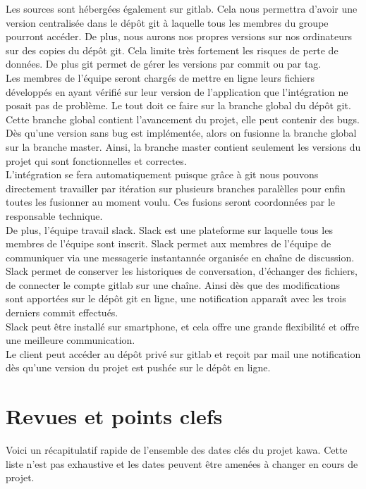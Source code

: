 \documentclass{../res/univ-projet}
\begin{document}
    Les sources sont hébergées également sur gitlab. Cela nous permettra d'avoir une version centralisée dans le dépôt git à laquelle tous les membres du groupe pourront accéder. De plus, nous aurons nos propres versions sur nos ordinateurs sur des copies du dépôt git. Cela limite très fortement les risques de perte de données. De plus git permet de gérer les versions par commit ou par tag.\\
    \indent Les membres de l'équipe seront chargés de mettre en ligne leurs fichiers développés en ayant vérifié sur leur version de l'application que l'intégration ne posait pas de problème. Le tout doit ce faire sur la branche global du dépôt git.\\
    \indent Cette branche global contient l'avancement du projet, elle peut contenir des bugs. Dès qu'une version sans bug est implémentée, alors on fusionne la branche global sur la branche master. Ainsi, la branche master contient seulement les versions du projet qui sont fonctionnelles et correctes.\\
    \indent L'intégration se fera automatiquement puisque grâce à git nous pouvons directement travailler par itération sur plusieurs branches paralèlles pour enfin toutes les fusionner au moment voulu. Ces fusions seront coordonnées par le responsable technique.\\

    De plus, l'équipe travail slack. Slack est une plateforme sur laquelle tous les membres de l'équipe sont inscrit. Slack permet aux membres de l'équipe de communiquer via une messagerie instantannée organisée en chaîne de discussion. Slack permet de conserver les historiques de conversation, d'échanger des fichiers, de connecter le compte gitlab sur une chaîne. Ainsi dès que des modifications sont apportées sur le dépôt git en ligne, une notification apparaît avec les trois derniers commit effectués.\\
    \indent Slack peut être installé sur smartphone, et cela offre une grande flexibilité et offre une meilleure communication.\\

    Le client peut accéder au dépôt privé sur gitlab et reçoit par mail une notification dès qu'une version du projet est pushée sur le dépôt en ligne.

\section{Revues et points clefs}
  Voici un récapitulatif rapide de l’ensemble des dates clés du projet kawa. Cette liste n’est pas exhaustive et les dates peuvent être amenées à changer en cours de projet.\\
\end{document}
